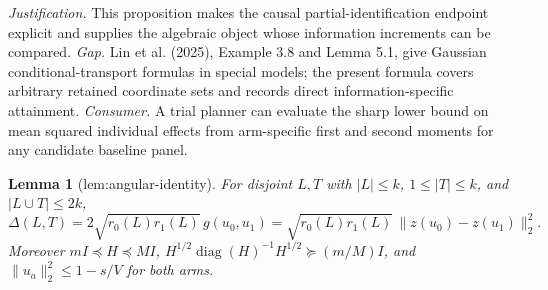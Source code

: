 \documentclass{article}
\newtheorem{lemma}{Lemma}
\begin{document}
\par\smallskip\noindent \textit{Justification.} This proposition makes the causal partial-identification endpoint explicit and supplies the algebraic object whose information increments can be compared. \textit{Gap.} Lin et al. (2025), Example 3.8 and Lemma 5.1, give Gaussian conditional-transport formulas in special models; the present formula covers arbitrary retained coordinate sets and records direct information-specific attainment. \textit{Consumer.} A trial planner can evaluate the sharp lower bound on mean squared individual effects from arm-specific first and second moments for any candidate baseline panel.

\begin{lemma}[lem:angular-identity]\label{lem:angular-identity}
For disjoint \(L,T\) with \(|L|\le k\), \(1\le|T|\le k\), and \(|L\cup T|\le2k\), \[\Delta(L,T)=2\sqrt{r_0(L)r_1(L)}\,g(u_0,u_1)=\sqrt{r_0(L)r_1(L)}\,\|z(u_0)-z(u_1)\|_2^2.\] Moreover \(mI\preceq H\preceq MI\), \(H^{1/2}\operatorname{diag}(H)^{-1}H^{1/2}\succeq(m/M)I\), and \(\|u_a\|_2^2\le1-s/V\) for both arms.
\end{lemma}
\end{document}
